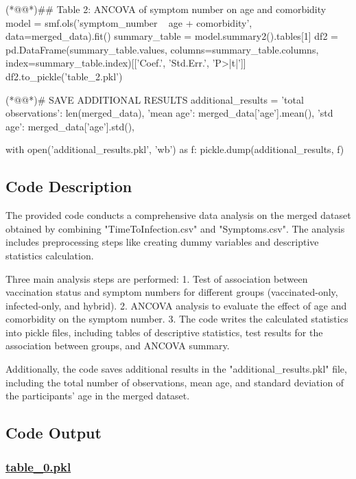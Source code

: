 \documentclass[11pt]{article}
\begin{document}
\begin{python}
(*@@*)## Table 2: ANCOVA of symptom number on age and comorbidity
model = smf.ols('symptom_number ~ age + comorbidity', data=merged_data).fit()
summary_table = model.summary2().tables[1]
df2 = pd.DataFrame(summary_table.values, columns=summary_table.columns, index=summary_table.index)[['Coef.', 'Std.Err.', 'P>|t|']]
df2.to_pickle('table_2.pkl')

(*@@*)# SAVE ADDITIONAL RESULTS
additional_results = {
    'total observations': len(merged_data),
    'mean age': merged_data['age'].mean(),
    'std age': merged_data['age'].std(),
}

with open('additional_results.pkl', 'wb') as f:
    pickle.dump(additional_results, f)

\end{python}

\subsection{Code Description}

The provided code conducts a comprehensive data analysis on the merged dataset obtained by combining "TimeToInfection.csv" and "Symptoms.csv". The analysis includes preprocessing steps like creating dummy variables and descriptive statistics calculation. 

Three main analysis steps are performed:
1. Test of association between vaccination status and symptom numbers for different groups (vaccinated-only, infected-only, and hybrid).
2. ANCOVA analysis to evaluate the effect of age and comorbidity on the symptom number.
3. The code writes the calculated statistics into pickle files, including tables of descriptive statistics, test results for the association between groups, and ANCOVA summary.

Additionally, the code saves additional results in the "additional\_results.pkl" file, including the total number of observations, mean age, and standard deviation of the participants' age in the merged dataset.

\subsection{Code Output}\hypertarget{file-table-0-pkl}{}

\subsubsection*{\hyperlink{code-Data Analysis-table-0-pkl}{table\_0.pkl}}
\end{document}
